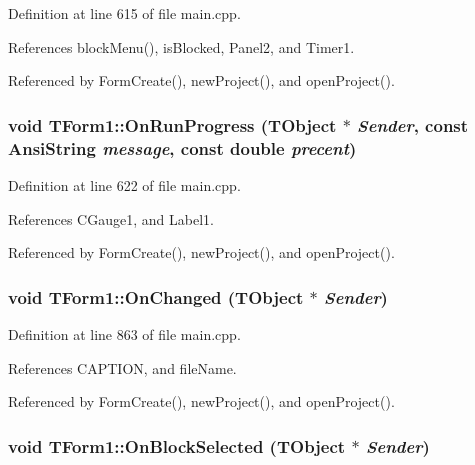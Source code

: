 Definition at line 615 of file main.cpp.

References blockMenu(), isBlocked, Panel2, and Timer1.

Referenced by FormCreate(), newProject(), and openProject().\hypertarget{classTForm1_34173b9dc2ccd99660a6a602eec607a4}{
\subsubsection[OnRunProgress]{\setlength{\rightskip}{0pt plus 5cm}void TForm1::OnRunProgress (TObject $\ast$ {\em Sender}, \/  const AnsiString {\em message}, \/  const double {\em precent})}}
\label{classTForm1_34173b9dc2ccd99660a6a602eec607a4}




Definition at line 622 of file main.cpp.

References CGauge1, and Label1.

Referenced by FormCreate(), newProject(), and openProject().\hypertarget{classTForm1_a7224379c3a100f708cf83e57d021b85}{
\subsubsection[OnChanged]{\setlength{\rightskip}{0pt plus 5cm}void TForm1::OnChanged (TObject $\ast$ {\em Sender})}}
\label{classTForm1_a7224379c3a100f708cf83e57d021b85}




Definition at line 863 of file main.cpp.

References CAPTION, and fileName.

Referenced by FormCreate(), newProject(), and openProject().\hypertarget{classTForm1_ac255960d6054a626a606621787a7d0f}{
\subsubsection[OnBlockSelected]{\setlength{\rightskip}{0pt plus 5cm}void TForm1::OnBlockSelected (TObject $\ast$ {\em Sender})}}
\label{classTForm1_ac255960d6054a626a606621787a7d0f}




